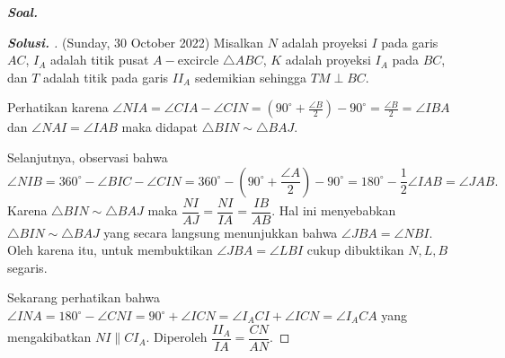 \textbf{\textit{Soal. }}

\begin{proof}[\textbf{Solusi. }] (Sunday, 30 October 2022) Misalkan $N$ adalah proyeksi $I$ pada garis $AC$, $I_A$ adalah titik pusat $A-$excircle $\triangle ABC$, $K$ adalah proyeksi $I_A$ pada $BC$, dan $T$ adalah titik pada garis $II_A$ sedemikian sehingga $TM \perp BC$. 

Perhatikan karena $\angle NIA = \angle CIA - \angle CIN = (90^\circ+\frac{\angle B}{2})-90^\circ=\frac{\angle B}{2} = \angle IBA$ dan $\angle NAI = \angle IAB$ maka didapat $\triangle BIN \sim \triangle BAJ$.

Selanjutnya, observasi bahwa
$$\angle NIB = 360^\circ - \angle BIC - \angle CIN
            = 360^\circ - \left(90^\circ + \dfrac{\angle A}{2}\right) - 90^\circ
            = 180^\circ - \dfrac{1}{2}\angle IAB
            = \angle JAB.$$
Karena $\triangle BIN \sim \triangle BAJ$ maka $\dfrac{NI}{AJ}=\dfrac{NI}{IA}=\dfrac{IB}{AB}$. Hal ini menyebabkan $\triangle BIN \sim \triangle BAJ$ yang secara langsung menunjukkan bahwa $\angle JBA = \angle NBI$. Oleh karena itu, untuk membuktikan $\angle JBA = \angle LBI$ cukup dibuktikan $N,L,B$ segaris.
% 

Sekarang perhatikan bahwa $\angle INA = 180^\circ - \angle CNI = 90^\circ + \angle ICN = \angle I_ACI + \angle ICN = \angle I_ACA$ yang mengakibatkan $NI \parallel CI_A$. Diperoleh $\dfrac{II_A}{IA}=\dfrac{CN}{AN}$.


\end{proof}

